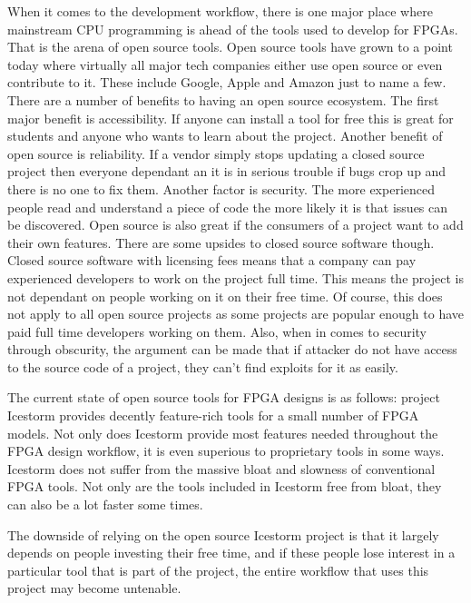 \documentclass{article}
\begin{document}
    When it comes to the development workflow, there is one major place where mainstream CPU programming
    is ahead of the tools used to develop for FPGAs. That is the arena of open source tools.
    Open source tools have grown to a point today where virtually all major tech companies
    either use open source or even contribute to it. These include Google, Apple and Amazon
    just to name a few.
    There are a number of benefits to having an open source ecosystem. The first major
    benefit is accessibility. If anyone can install a tool for free this is great
    for students and anyone who wants to learn about the project.
    Another benefit of open source is reliability. If a vendor simply stops updating a closed
    source project then everyone dependant an it is in serious trouble if bugs
    crop up and there is no one to fix them.
    Another factor is security. The more experienced people read and understand a piece of
    code the more likely it is that issues can be discovered.
    Open source is also great if the consumers of a project want to add their own features.
    There are some upsides to closed source software though. Closed source software with
    licensing fees means that a company can pay experienced developers to work on the project full
    time. This means the project is not dependant on people working on it on their free time.
    Of course, this does not apply to all open source projects as some projects are popular
    enough to have paid full time developers working on them.
    Also, when in comes to security through obscurity, the argument can be made that
    if attacker do not have access to the source code of a project, they can't find
    exploits for it as easily.

    The current state of open source tools for FPGA designs is as follows:
    project Icestorm provides decently feature-rich tools for a small number of FPGA
    models. Not only does Icestorm provide most features needed throughout the FPGA
    design workflow, it is even superious to proprietary tools in some ways. Icestorm
    does not suffer from the massive bloat and slowness of conventional FPGA tools.
    Not only are the tools included in Icestorm free from bloat, they can also be
    a lot faster some times.

    The downside of relying on the open source Icestorm project is that it largely depends
    on people investing their free time, and if these people lose interest in a particular
    tool that is part of the project, the entire workflow that uses this project
    may become untenable.
\end{document}
